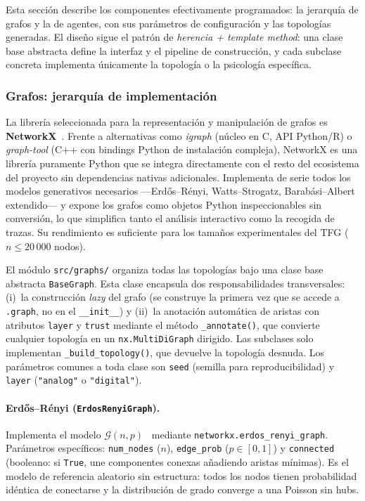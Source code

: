 Esta sección describe los componentes efectivamente programados: la jerarquía de grafos y la de agentes, con sus parámetros de configuración y las topologías generadas. El diseño sigue el patrón de \emph{herencia + template method}: una clase base abstracta define la interfaz y el pipeline de construcción, y cada subclase concreta implementa únicamente la topología o la psicología específica.

\subsubsection{Grafos: jerarquía de implementación}

La librería seleccionada para la representación y manipulación de grafos es \textbf{NetworkX}~\cite{NetworkX2008}. Frente a alternativas como \textit{igraph} (núcleo en C, API Python/R) o \textit{graph-tool} (C++ con bindings Python de instalación compleja), NetworkX es una librería puramente Python que se integra directamente con el resto del ecosistema del proyecto sin dependencias nativas adicionales. Implementa de serie todos los modelos generativos necesarios —Erdős–Rényi, Watts–Strogatz, Barabási–Albert extendido— y expone los grafos como objetos Python inspeccionables sin conversión, lo que simplifica tanto el análisis interactivo como la recogida de trazas. Su rendimiento es suficiente para los tamaños experimentales del TFG ($n \leq 20\,000$ nodos).

El módulo \texttt{src/graphs/} organiza todas las topologías bajo una clase base abstracta \texttt{BaseGraph}. Esta clase encapsula dos responsabilidades transversales: (i)~la construcción \emph{lazy} del grafo (se construye la primera vez que se accede a \texttt{.graph}, no en el \texttt{\_\_init\_\_}) y (ii)~la anotación automática de aristas con atributos \texttt{layer} y \texttt{trust} mediante el método \texttt{\_annotate()}, que convierte cualquier topología en un \texttt{nx.MultiDiGraph} dirigido. Las subclases solo implementan \texttt{\_build\_topology()}, que devuelve la topología desnuda. Los parámetros comunes a toda clase son \texttt{seed} (semilla para reproducibilidad) y \texttt{layer} (\texttt{"analog"} o \texttt{"digital"}).

\paragraph{Erdős–Rényi (\texttt{ErdosRenyiGraph}).}
Implementa el modelo $\mathcal{G}(n, p)$~\cite{ErdosRenyi1960} mediante \texttt{networkx.erdos\_renyi\_graph}. Parámetros específicos: \texttt{num\_nodes} ($n$), \texttt{edge\_prob} ($p \in [0,1]$) y \texttt{connected} (booleano: si \texttt{True}, une componentes conexas añadiendo aristas mínimas). Es el modelo de referencia aleatorio sin estructura: todos los nodos tienen probabilidad idéntica de conectarse y la distribución de grado converge a una Poisson sin hubs.

